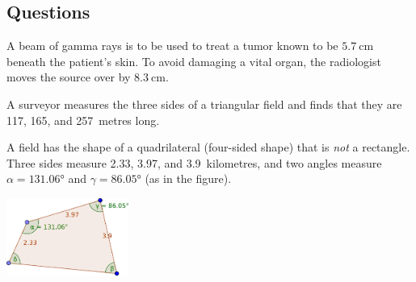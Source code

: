 \subsection*{Questions}
\begin{questions}
  \question A beam of gamma rays is to be used to treat a tumor known to be $ \SI{5.7}{\centi\metre} $ beneath
            the patient's skin. To avoid damaging a vital organ, the radiologist moves the source over by
            $ \SI{8.3}{\centi\metre} $.

  \question A surveyor measures the three sides of a triangular field and finds that they are 117, 165, and 257~metres long.

  \question A field has the shape of a quadrilateral (four-sided shape) that is \emph{not} a rectangle. Three
            sides measure 2.33, 3.97, and 3.9~kilometres, and two angles measure $ \alpha = \ang{131.06} $
            and $ \gamma = \ang{86.05} $ (as in the figure).
            \begin{center}
              \includegraphics[width=0.3\textwidth]{fieldfortrig}
            \end{center}
    \begin{parts}

\end{parts}
\end{questions}
